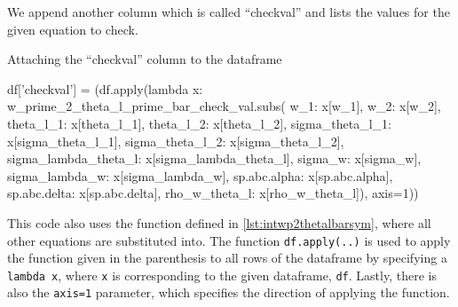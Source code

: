 We append another column which is called \enquote{checkval} 
and lists the values for the given equation to check.
\begin{listing}[!ht]
    \caption{Attaching the \enquote{checkval} column to the dataframe}
    \label{lst:attachcheckvaltodataframe}
    \begin{pythoncode}
        df['checkval'] = (df.apply(lambda x: w_prime_2_theta_l_prime_bar_check_val.subs({
                 w_1: x[w_1], w_2: x[w_2], theta_l_1: x[theta_l_1], theta_l_2: x[theta_l_2],
                 sigma_theta_l_1: x[sigma_theta_l_1], sigma_theta_l_2: x[sigma_theta_l_2],
                 sigma_lambda_theta_l: x[sigma_lambda_theta_l], sigma_w: x[sigma_w],
                 sigma_lambda_w: x[sigma_lambda_w], sp.abc.alpha: x[sp.abc.alpha],
                 sp.abc.delta: x[sp.abc.delta], rho_w_theta_l: x[rho_w_theta_l]}), axis=1))
    \end{pythoncode}
\end{listing}
This code also uses the function defined in \cref{lst:intwp2thetalbarsym}, 
where all other equations are substituted into.
The function \texttt{df.apply(..)} is used 
to apply the function given in the parenthesis to all rows of the dataframe 
by specifying a \texttt{lambda x}, 
where \texttt{x} is corresponding to the given dataframe, \texttt{df}.
Lastly, there is also the \texttt{axis=1} parameter, 
which specifies the direction of applying the function.

